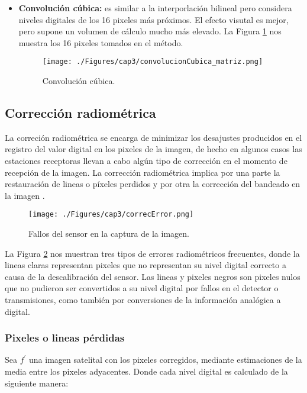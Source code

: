 \begin{itemize}
		    		\item \textbf{Convoluci\'on c\'ubica:} es similar a la interporlaci\'on bilineal pero considera niveles digitales de los 16 pixeles m\'as pr\'oximos. El efecto visutal es mejor, pero supone un volumen de c\'alculo mucho m\'as elevado. La Figura \ref{fig:convCubica2} nos muestra los 16 pixeles tomados en el m\'etodo. 
		    				    \begin{figure}[H]
		    				    	\centering
		    				    	\texttt{[image: ./Figures/cap3/convolucionCubica\_matriz.png]}
		    				    	\caption{Convoluci\'on c\'ubica.}
		    				    	\label{fig:convCubica2}
		    				    \end{figure}
	\end{itemize}
\subsection{Correcci\'on radiom\'etrica}
La correci\'on radiom\'etrica se encarga de minimizar los desajustes producidos en el registro del valor digital en los pixeles de la imagen, de hecho en algunos casos las estaciones receptoras llevan a cabo alg\'un tipo de correcci\'on en el momento de recepci\'on de la imagen. La correcci\'on radiom\'etrica implica por una parte la restauraci\'on de lineas o p\'ixeles perdidos y por otra la correcci\'on del bandeado en la imagen \cite{teledUm}.
    \begin{figure}[H]
    	\centering
    	\texttt{[image: ./Figures/cap3/correcError.png]}
    	\caption{Fallos del sensor en la captura de la imagen.}
    	\label{fig:correcError}
    \end{figure}
La Figura \ref{fig:correcError} nos muestran tres tipos de errores radiom\'etricos frecuentes, donde la lineas claras representan pixeles que no representan su nivel digital correcto a causa de la descalibraci\'on del sensor. Las lineas y pixeles negros son pixeles nulos que no pudieron ser convertidos a su nivel digital por fallos en el detector o transmisiones, como tambi\'en por conversiones de la informaci\'on anal\'ogica a digital.

\subsubsection{Pixeles o lineas p\'erdidas}\label{subsec:pixelesP}
Sea $ f^{'} $ una imagen satelital con los pixeles corregidos, mediante estimaciones de la media entre los pixeles adyacentes. Donde cada nivel digital es calculado de la siguiente manera: 

